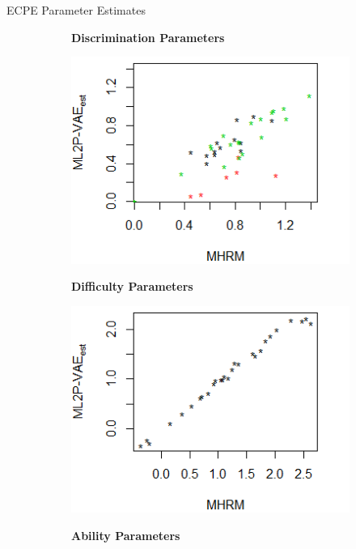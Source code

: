\documentclass{beamer}
\theoremstyle{definition}
\newcommand*{\figuretitlesmall}[1]{
  {\centering \tiny{
  \textbf{#1}
  \par\medskip}}
}
\begin{document}
\begin{frame}{ECPE Parameter Estimates}
\begin{figure}[h]
\centering
    \begin{subfigure}{.32\textwidth}
      \centering
      \figuretitlesmall{Discrimination Parameters}
      \includegraphics[width=.9\linewidth]{../img/ml_journal_results/ecpe/vae_est_disc_ecpe.png}
    \end{subfigure}
    \begin{subfigure}{.32\textwidth}
      \centering
      \figuretitlesmall{Difficulty Parameters}
      \includegraphics[width=.9\linewidth]{../img/ml_journal_results/ecpe/vae_est_diff_ecpe.png}
    \end{subfigure}
    \begin{subfigure}{.32\textwidth}
      \centering
      \figuretitlesmall{Ability Parameters}

\end{subfigure}
\end{figure}
\end{frame}
\end{document}
